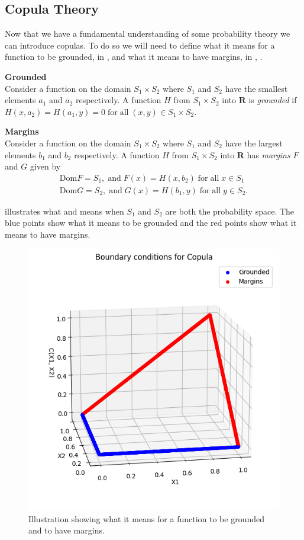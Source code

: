 \subsection{Copula Theory}
Now that we have a fundamental understanding of some probability theory we can introduce copulas. To do so we will need to define what it means for a function to be grounded, in , and what it means to have margins, in , \citet[p.~9]{Nelsen2006}.

\begin{definition}\label{def:grounded}\textbf{Grounded} \\
    Consider a function on the domain $S_1\times S_2$ where $S_1$ and $S_2$ have the smallest elements $a_1$ and $a_2$ respectively. A function $H$ from $S_1\times S_2$ into $\mathbf{R}$ is \emph{grounded} if $H(x,a_2)= H(a_1,y) = 0 \;\mathrm{for \;all\;} (x,y) \in S_1\times S_2.$
\end{definition}

\begin{definition}\label{def:margins}
    \textbf{Margins}\\
    Consider a function on the domain $S_1\times S_2$ where $S_1$ and $S_2$ have the largest elements $b_1$ and $b_2$ respectively. A function $H$ from $S_1\times S_2$ into $\mathbf{R}$ has \emph{margins} $F$ and $G$ given by
    \begin{align*}
        \mathrm{Dom}F = S_1, \;\mathrm{and }\; F(x) = H(x,b_2) \;\mathrm{for \;all\;} x \in S_1\\
        \mathrm{Dom}G = S_2, \;\mathrm{and }\; G(x) = H(b_1,y) \;\mathrm{for \;all\;} y \in S_2.
    \end{align*}
\end{definition}

 illustrates what  and  means when $S_1$ and $S_2$ are both the probability space. The blue points show what it means to be grounded and the red points show what it means to have margins. 

\begin{figure}
    \centering
    \includegraphics[width=0.5\linewidth]{3Theory/pictures/MarginsAndGrounded.png}
    \caption{Illustration showing what it means for a function to be grounded and to have margins.}
    \label{fig:GroundedAndMargins}
\end{figure}

